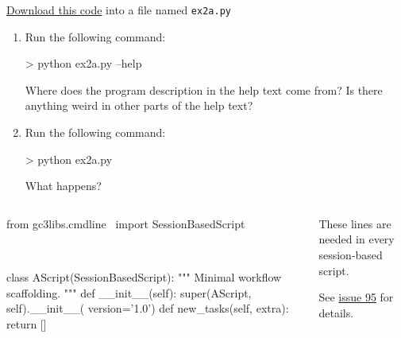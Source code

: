 \documentclass[english,serif,mathserif,xcolor=pdftex,dvipsnames,table]{beamer}
\begin{document}
\begin{frame}[fragile]
  \begin{exercise*}[2.A]

    \+
    \href{https://raw.githubusercontent.com/uzh/gc3pie/master/docs/programmers/tutorials/workflows/solutions/ex2a.py}{Download this code} into a file named \texttt{ex2a.py}

    \begin{enumerate}
    \item Run the following command:
\begin{sh}
> python ex2a.py --help
\end{sh}
        Where does the program description in the help text come from?
        Is there anything weird in other parts of the help text?

    \item Run the following command:
\begin{sh}
> python ex2a.py
\end{sh}
        What happens?
      \end{enumerate}
  \end{exercise*}
\end{frame}


\begin{frame}[fragile]
  \begin{columns}[t]
    \begin{column}{0.7\linewidth}
\begin{python}
from gc3libs.cmdline \
  import SessionBasedScript

~~
  ~~
  ~~

class AScript(SessionBasedScript):
  """
  Minimal workflow scaffolding.
  """
  def __init__(self):
    super(AScript, self).__init__(
        version='1.0')
  def new_tasks(self, extra):
    return []
\end{python}
    \end{column}
    \begin{column}{0.4\linewidth}
      \begin{flushright}
        These lines are needed in every session-based script.

        \+
        See \href{https://github.com/uzh/gc3pie/issues/95}{issue 95} for details.
      \end{flushright}
    \end{column}
  \end{columns}
\end{frame}
\end{document}
